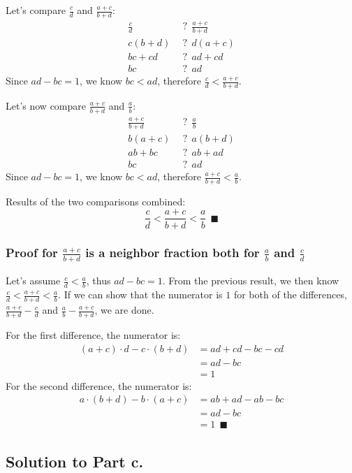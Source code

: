 \documentclass{article}
\begin{document}
Let's compare $\frac{c}{d}$ and $\frac{a+c}{b+d}$:
\begin{displaymath}
\begin{split}
\frac{c}{d}\ \ &?\ \ \frac{a+c}{b+d}\\
     c(b+d)\ \ &?\ \ d(a+c)\\
      bc+cd\ \ &?\ \ ad+cd\\
         bc\ \ &?\ \ ad
\end{split}
\end{displaymath}
Since $ad-bc = 1$, we know $bc < ad$, therefore $\frac{c}{d} < \frac{a+c}{b+d}$.

Let's now compare $\frac{a+c}{b+d}$ and $\frac{a}{b}$:
\begin{displaymath}
\begin{split}
\frac{a+c}{b+d}\ \ &?\ \ \frac{a}{b}\\
         b(a+c)\ \ &?\ \ a(b+d)\\
          ab+bc\ \ &?\ \ ab+ad\\
             bc\ \ &?\ \ ad
\end{split}
\end{displaymath}
Since $ad-bc = 1$, we know $bc < ad$, therefore $\frac{a+c}{b+d} < \frac{a}{b}$.

Results of the two comparisons combined:
\[
	\frac{c}{d} < \frac{a+c}{b+d} < \frac{a}{b}\ \ \blacksquare
\]

\subsubsection*{Proof for $\frac{a+c}{b+d}$ is a neighbor fraction both for $\frac{a}{b}$ and $\frac{c}{d}$}
Let's assume $\frac{c}{d} < \frac{a}{b}$, thus $ad-bc = 1$. From the previous result, we then know $\frac{c}{d} < \frac{a+c}{b+d} < \frac{a}{b}$. If we can show that the numerator is $1$ for both of the differences, $\frac{a+c}{b+d}-\frac{c}{d}$ and $\frac{a}{b}-\frac{a+c}{b+d}$, we are done. 

For the first difference, the numerator is:
\begin{displaymath}
\begin{split}
(a+c) \cdot d - c \cdot (b+d) &= ad+cd - bc-cd\\
                              &= ad-bc\\
                              &= 1
\end{split}
\end{displaymath}
For the second difference, the numerator is:
\begin{displaymath}
\begin{split}
a \cdot (b+d) - b \cdot (a+c) &= ab+ad - ab-bc\\
                              &= ad-bc\\
                              &= 1\ \ \blacksquare
\end{split}
\end{displaymath}

\subsection*{Solution to Part c.}
\end{document}
